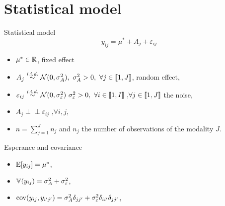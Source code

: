 \documentclass[unknownkeysallowed]{beamer}
\begin{document}
\section{Statistical model}
\label{sec:model}



\begin{frame}{Statistical model}
{\[y_{ij}=\mu^*+ A_j+\varepsilon_{ij}\]}

\medskip

 \begin{itemize}
        \item $\mu^* \in \mathbb{R}$, fixed effect
        \item $A_j \overset{\textit{i.i.d.}}{\sim} \mathcal{N}(0, \sigma_A^2), \text{ } \sigma_A^2>0, \text{ } \forall j \in \llbracket 1,J \rrbracket$, random effect,
        \item $\varepsilon_{ij} \overset{\textit{i.i.d.}}{\sim} \mathcal{N}(0,\sigma_{\varepsilon}^2) \text{ } \sigma_{\varepsilon}^2>0, \text{ } \forall i \in \llbracket 1,I \rrbracket \text{ ,} \forall j \in \llbracket 1,J \rrbracket$ the noise,
        \item $A_j \perp \!\!\! \perp \varepsilon_{ij} \text{ ,}\forall i,j$,
        \item $n=\sum_{j=1}^{J} n_j$ and $n_j$ the number of observations of the modality $J$.
    \end{itemize}

\end{frame}

\begin{frame}{Esperance and covariance}
\begin{itemize}
    \item $\mathbb{E}[y_{ij}]=\mu^* $, 
    \item $\mathbb{V}(y_{ij})=\sigma_A^2 + \sigma_{\varepsilon}^2$,
    \item $\operatorname{cov}(y_{ij},y_{i'j'})=\sigma_A^2\delta_{jj'} + \sigma_{\varepsilon}^2\delta_{ii'}\delta_{jj'}$,
\end{itemize}


\end{frame}
\end{document}

